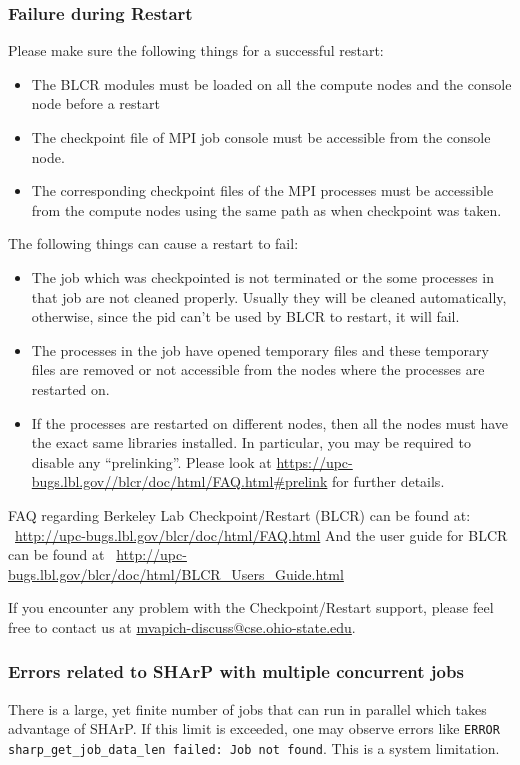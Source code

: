 \subsubsection{Failure during Restart}

Please make sure the following things for a successful restart:
\begin{itemize}
\item The BLCR modules must be loaded on all the compute nodes and
the console node before a restart
\item The checkpoint file of MPI job console must be accessible from
the console node.
\item The corresponding checkpoint files of the MPI processes must
be accessible from the compute nodes using the same path as when
checkpoint was taken.
\end{itemize}

The following things can cause a restart to fail:
\begin{itemize}

\item The job which was checkpointed is not terminated or the some processes in
that job are not cleaned properly. Usually they will be cleaned automatically,
otherwise, since the pid can't be used by BLCR to restart, it will fail.

\item The processes in the job have opened temporary files and these temporary
files are removed or not accessible from the nodes where the processes are
restarted on.

\item If the processes are restarted on different nodes, then all the nodes must
have the exact same libraries installed.  In particular, you may be required to
disable any ``prelinking''.  Please look at
\url{https://upc-bugs.lbl.gov//blcr/doc/html/FAQ.html#prelink} for further
details.

\end{itemize}

FAQ regarding Berkeley Lab Checkpoint/Restart (BLCR) can be found at:\\
~\href{http://upc-bugs.lbl.gov/blcr/doc/html/FAQ.html}{http://upc-bugs.lbl.gov/blcr/doc/html/FAQ.html}
And the user guide for BLCR can be found at
~\href{http://upc-bugs.lbl.gov/blcr/doc/html/BLCR\_Users\_Guide.html}{http://upc-bugs.lbl.gov/blcr/doc/html/BLCR\_Users\_Guide.html}


If you encounter any problem with the Checkpoint/Restart support, please
feel free to contact us at \href{mailto:mvapich-discuss@cse.ohio-state.edu}
{mvapich-discuss@cse.ohio-state.edu}.

\subsubsection{Errors related to SHArP with multiple concurrent jobs}
\label{sec:sharp-errors}

There is a large, yet finite number of jobs that can run in parallel which takes
advantage of SHArP. If this limit is exceeded, one may observe errors like
\texttt{ERROR sharp\_get\_job\_data\_len failed: Job not found}. This is a
system limitation.
